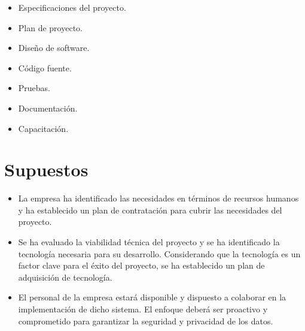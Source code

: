   \begin{itemize}
    \item Especificaciones del proyecto.
    \item Plan de proyecto.
    \item Diseño de software.
    \item Código fuente.
    \item Pruebas.
    \item Documentación.
    \item Capacitación.
  \end{itemize}

  \section{Supuestos}
  
    \begin{itemize}
        \item La empresa ha identificado las necesidades en términos de recursos humanos y ha establecido un plan de contratación para cubrir las necesidades del proyecto.
        \item Se ha evaluado la viabilidad técnica del proyecto y se ha identificado la tecnología necesaria para su desarrollo. Considerando que la tecnología es un factor clave para el éxito del proyecto, se ha establecido un plan de adquisición de tecnología.
        \item El personal de la empresa estará disponible y dispuesto a colaborar en la implementación de dicho sistema. El enfoque deberá ser proactivo y comprometido para garantizar la seguridad y privacidad de los datos.
    \end{itemize}

